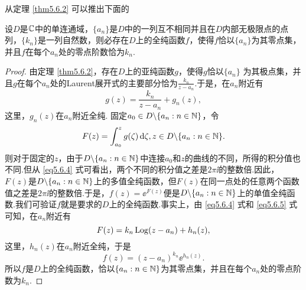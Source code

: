从定理 \ref{thm5.6.2} 可以推出下面的
\begin{theorem}\label{thm5.6.3}
  设$D$是$\mathbb C$中的单连通域，$\{a_n\}$是$D$中的一列互不相同并且在$D$内部无极限点的点列，$\{k_n\}$是一列自然数，则必存在$D$上的全纯函数$f$，使得$f$恰以$\{a_n\}$为其零点集，并且$f$在每个$a_n$处的零点阶数恰为$k_n$.
\end{theorem}
\begin{proof}
  由定理 \ref{thm5.6.2}，存在$D$上的亚纯函数$g$，使得$g$恰以$\{a_n\}$
  为其极点集，并且$g$在每个$a_n$处的Laurent展开式的主要部分恰为$\frac{k_n}{z-a_n}$.于是，在$a_n$附近有
  \begin{equation}\label{eq5.6.4}
    g(z) = \frac{k_n}{z-a_n}+g_n(z),
  \end{equation}
  这里，$g_n(z)$在$a_n$附近全纯. 固定$a_0\in D\backslash\{a_n:n\in\mathbb N\}$，令
  \begin{equation}\label{eq5.6.5}
    F(z) = \int_{a_0}^zg(\zeta)\mathop{}\!\mathrm{d} \zeta,z\in D\backslash\{a_n:n\in\mathbb N\}.
  \end{equation}
  则对于固定的$z$，由于$D\backslash\{a_n:n\in\mathbb N\}$中连接$a_0$和$z$的曲线的不同，所得的积分值也不同.但从 \eqref{eq5.6.4} 式可看出，两个不同的积分值之差是$2\pi\ii$的整数倍.因此，$F(z)$是$D\backslash\{a_n:n\in\mathbb N\}$上的多值全纯函数，但$F(z)$在同一点处的任意两个函数值之差是$2\pi\ii$的整数倍.于是，$f(z)=\ee^{F(z)}$便是$D\backslash\{a_n:n\in\mathbb N\}$上的单值全纯函数.我们可验证$f$就是要求的$D$上的全纯函数.事实上，由 \eqref{eq5.6.4} 式和 \eqref{eq5.6.5} 式可知，在$a_n$附近有
  \[
    F(z) = k_n\operatorname{Log}(z-a_n) + h_n(z),
  \]
  这里，$h_n(z)$在$a_n$附近全纯，于是
  \[
    f(z) = (z-a_n)^{k_n}\ee^{h_n(z)}.
  \]
  所以$f$是$D$上的全纯函数，恰以$\{a_n:n\in\mathbb N\}$为其零点集，并且在每个$a_n$处的零点阶数为$k_n$.
\end{proof}

